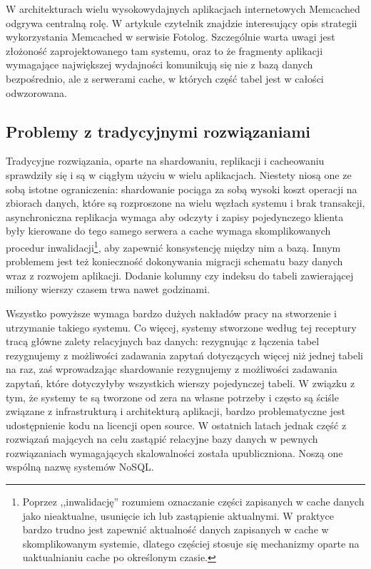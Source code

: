 W architekturach wielu wysokowydajnych aplikacjach internetowych Memcached odgrywa centralną rolę.
W artykule \cite{highscalability-mysql-memcached} czytelnik znajdzie interesujący opis strategii wykorzystania Memcached w serwisie Fotolog.
Szczególnie warta uwagi jest złożoność zaprojektowanego tam systemu, oraz to że fragmenty aplikacji wymagające największej wydajności komunikują się nie z bazą danych bezpośrednio, ale z serwerami cache, w których część tabel jest w całości odwzorowana.

\subsection{Problemy z tradycyjnymi rozwiązaniami}

Tradycyjne rozwiązania, oparte na shardowaniu, replikacji i cacheowaniu sprawdziły się i są w ciągłym użyciu w wielu aplikacjach.
Niestety niosą one ze sobą istotne ograniczenia: shardowanie pociąga za sobą wysoki koszt operacji na zbiorach danych, które są rozproszone na wielu węzłach systemu i brak transakcji, asynchroniczna replikacja wymaga aby odczyty i zapisy pojedynczego klienta były kierowane do tego samego serwera a cache wymaga skomplikowanych procedur inwalidacji\footnote{Poprzez ,,inwalidację'' rozumiem oznaczanie części zapisanych w cache danych jako nieaktualne, usunięcie ich lub zastąpienie aktualnymi. W praktyce bardzo trudno jest zapewnić aktualność danych zapisanych w cache w skomplikowanym systemie, dlatego częściej stosuje się mechanizmy oparte na uaktualnianiu cache po określonym czasie.}, aby zapewnić konsystencję między nim a bazą.
Innym problemem jest też konieczność dokonywania migracji schematu bazy danych wraz z rozwojem aplikacji.
Dodanie kolumny czy indeksu do tabeli zawierającej miliony wierszy czasem trwa nawet godzinami.

Wszystko powyższe wymaga bardzo dużych nakładów pracy na stworzenie i utrzymanie takiego systemu.
Co więcej, systemy stworzone według tej receptury tracą główne zalety relacyjnych baz danych: rezygnując z łączenia tabel rezygnujemy z możliwości zadawania zapytań dotyczących więcej niż jednej tabeli na raz, zaś wprowadzając shardowanie rezygnujemy z możliwości zadawania zapytań, które dotyczyłyby wszystkich wierszy pojedynczej tabeli.
W związku z tym, że systemy te są tworzone od zera na własne potrzeby i często są ściśle związane z infrastrukturą i architekturą aplikacji, bardzo problematyczne jest udostępnienie kodu na licencji open source.
W ostatnich latach jednak część z rozwiązań mających na celu zastąpić relacyjne bazy danych w pewnych rozwiązaniach wymagających skalowalności została upubliczniona.
Noszą one wspólną nazwę systemów NoSQL.

